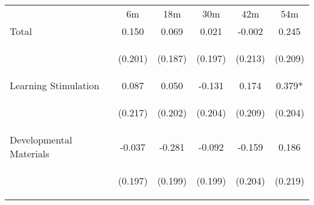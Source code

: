 \begin{tabular}{lccccc}
\hline \noalign{\smallskip} & 6m & 18m & 30m & 42m & 54m\\
\noalign{\smallskip}\hline \noalign{\smallskip}Total & 0.150 & 0.069 & 0.021 & -0.002 & 0.245\\
 & \begin{footnotesize}(0.201)\end{footnotesize} & \begin{footnotesize}(0.187)\end{footnotesize} & \begin{footnotesize}(0.197)\end{footnotesize} & \begin{footnotesize}(0.213)\end{footnotesize} & \begin{footnotesize}(0.209)\end{footnotesize}\\
\noalign{\smallskip}Learning Stimulation & 0.087 & 0.050 & -0.131 & 0.174 & 0.379*\\
 & \begin{footnotesize}(0.217)\end{footnotesize} & \begin{footnotesize}(0.202)\end{footnotesize} & \begin{footnotesize}(0.204)\end{footnotesize} & \begin{footnotesize}(0.209)\end{footnotesize} & \begin{footnotesize}(0.204)\end{footnotesize}\\
\noalign{\smallskip}Developmental Materials & -0.037 & -0.281 & -0.092 & -0.159 & 0.186\\
 & \begin{footnotesize}(0.197)\end{footnotesize} & \begin{footnotesize}(0.199)\end{footnotesize} & \begin{footnotesize}(0.199)\end{footnotesize} & \begin{footnotesize}(0.204)\end{footnotesize} & \begin{footnotesize}(0.219)\end{footnotesize}\\

\end{tabular}
